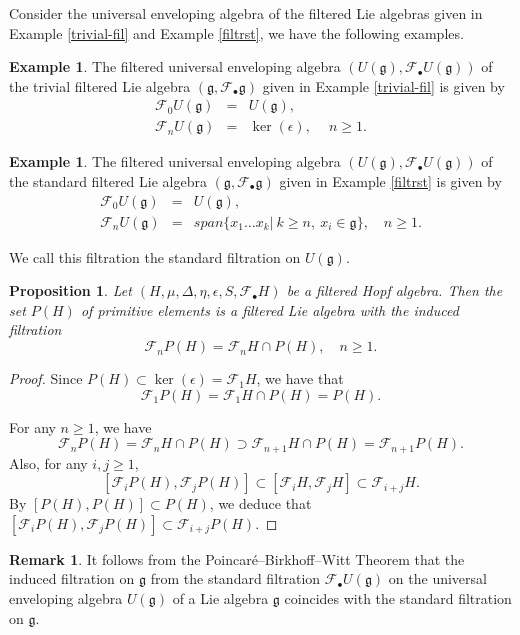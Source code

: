 \documentclass[12pt]{amsart}
\newtheorem{pro}[thm]{Proposition}
\theoremstyle{definition}   %
\newtheorem{ex}[thm]{Example}
\newtheorem{rmk}[thm]{Remark}
\newcommand{\g}{\mathfrak g}
\newcommand{\huaF}{\mathcal{F}}
\begin{document}
  Consider the universal enveloping algebra of the filtered Lie algebras given in Example \ref{trivial-fil} and Example \ref{filtrst}, we have the following examples.





\begin{ex}\label{expow-1}
  The  filtered universal enveloping algebra $(U(\g),\huaF_{\bullet}U(\g))$ of the trivial  filtered Lie algebra $(\g,\huaF_{\bullet}\g)$ given in Example \ref{trivial-fil} is given by
\begin{eqnarray*}
\huaF_0U(\g)&=&U(\g),\\
\huaF_nU(\g)&=&\ker(\epsilon), \quad\ n\geq 1.
\end{eqnarray*}
\end{ex}


\begin{ex}\label{expow}
The  filtered universal enveloping algebra $(U(\g),\huaF_{\bullet}U(\g))$ of the standard filtered Lie algebra $(\g,\huaF_{\bullet}\g)$ given in Example \ref{filtrst} is given by
\begin{eqnarray*}
\huaF_0U(\g)&=&U(\g),\\
\huaF_nU(\g)&=&span\{x_1\ldots x_k|\ k\geq n,\ x_i\in \g\}, \quad n\geq 1.
\end{eqnarray*}

We call this filtration the standard filtration on $U(\g)$.
\end{ex}


\begin{pro}\label{indfilt}
    Let $(H, \mu, \Delta, \eta, \epsilon, S,\huaF_{\bullet}H)$ be a filtered Hopf algebra. Then the set $P(H)$ of primitive elements is a filtered Lie algebra with the induced filtration $$\huaF_nP(H)=\huaF_nH\cap P(H),\quad n\geq 1.$$
\end{pro}
\begin{proof}
  Since $P(H)\subset\ker(\epsilon)=\huaF_1 H$, we have that
  $$\huaF_1 P(H)=\huaF_1 H\cap P(H)=P(H).$$

For any $n\geq 1$, we have
    $$\huaF_nP(H)=\huaF_nH\cap P(H)     \supset \huaF_{n+1}H\cap P(H)=\huaF_{n+1}P(H).$$
Also, for any $i,j\geq 1$,
$$
[\huaF_iP(H),\huaF_jP(H)]\subset [\huaF_iH,\huaF_jH]\subset \huaF_{i+j}H.
$$
By $[P(H),P(H)]\subset P(H)$, we deduce  that $[\huaF_iP(H),\huaF_jP(H)]\subset \huaF_{i+j}P(H)$.
\end{proof}

\begin{rmk}
It follows from the Poincar\'e--Birkhoff--Witt Theorem that
the induced filtration on $\g$ from the standard filtration  $\huaF_{\bullet}U(\g)$   on the universal enveloping algebra $U(\g)$ of a Lie algebra $\g$  coincides with the standard filtration on $\g$.
\end{rmk}
\end{document}
